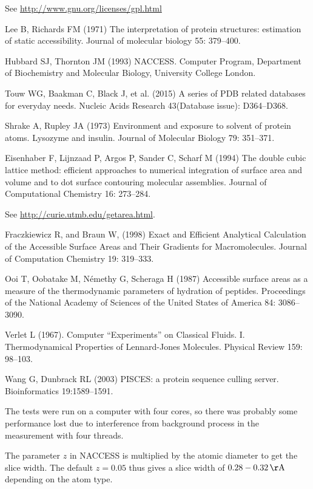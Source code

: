 \documentclass[a4paper,11pt]{article}
\begin{document}
\begin{small}

\begin{thebibliography}{50}

  See  \url{http://www.gnu.org/licenses/gpl.html}

  Lee B, Richards FM (1971) The interpretation of protein
  structures: estimation of static accessibility. Journal of molecular
  biology 55: 379--400.

  Hubbard SJ, Thornton JM (1993) NACCESS. Computer Program,
  Department of Biochemistry and Molecular Biology, University College
  London.

  Touw WG, Baakman C, Black J, et al. (2015)
  A series of PDB related databases for everyday needs.
  Nucleic Acids Research 43(Database issue): D364--D368.

  Shrake A, Rupley JA (1973) Environment and exposure to
  solvent of protein atoms. Lysozyme and insulin. Journal of Molecular
  Biology 79: 351--371.

  Eisenhaber F, Lijnzaad P, Argos P, Sander C, Scharf M (1994)
  The double cubic lattice method: efficient approaches to numerical
  integration of surface area and volume and to dot surface contouring
  molecular assemblies. Journal of Computational Chemistry 16: 273--284.

  See \url{http://curie.utmb.edu/getarea.html}.

  Fraczkiewicz R, and Braun W, (1998) Exact and Efficient Analytical
  Calculation of the Accessible Surface Areas and Their Gradients for
  Macromolecules. Journal of Computation Chemistry 19: 319--333.

  Ooi T, Oobatake M, Némethy G, Scheraga H (1987)
  Accessible surface areas as a measure of the thermodynamic
  parameters of hydration of peptides. Proceedings of the National
  Academy of Sciences of the United States of America 84: 3086--3090.

  Verlet L (1967). Computer ``Experiments'' on Classical
  Fluids. I. Thermodynamical Properties of Lennard-Jones
  Molecules. Physical Review 159: 98--103.

  Wang G, Dunbrack RL (2003) PISCES: a protein sequence culling server. 
  Bioinformatics 19:1589--1591.

  The tests were run on a computer with four
  cores, so there was probably some performance lost due to
  interference from background process in the measurement with four
  threads.

 The parameter $z$ in NACCESS is multiplied by
  the atomic diameter to get the slice width. The default $z=0.05$
  thus gives a slice width of $0.28 - 0.32\,\mathrm{\AA}$ depending on
  the atom type.

\end{thebibliography}

\end{small}
\end{document}
